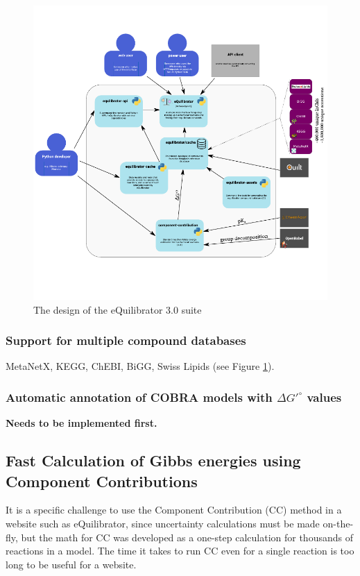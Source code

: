\documentclass{article}
\begin{document}
\begin{figure}
    \centering
    \includegraphics[width=\textwidth]{equilibrator_3_0.pdf}
    \caption{The design of the eQuilibrator 3.0 suite}
    \label{fig:eq3_design}
\end{figure}

\subsubsection{Support for multiple compound databases}
MetaNetX, KEGG, ChEBI, BiGG, Swiss Lipids (see Figure \ref{fig:eq3_design}).

\subsubsection{Automatic annotation of COBRA models with $\Delta G'^\circ$ values}
\textbf{Needs to be implemented first.}

\subsection{Fast Calculation of Gibbs energies using Component Contributions}

It is a specific challenge to use the Component Contribution (CC) method in a website such as eQuilibrator, since uncertainty calculations must be made on-the-fly, but the math for CC was developed as a one-step calculation for thousands of reactions in a model. The time it takes to run CC even for a single reaction is too long to be useful for a website.
\end{document}
